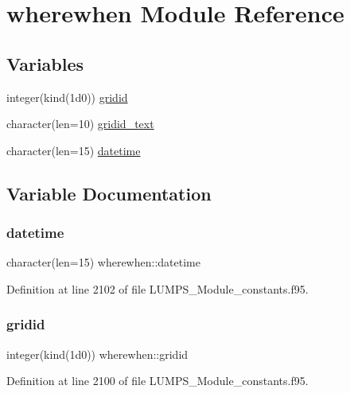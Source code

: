 \hypertarget{namespacewherewhen}{}\section{wherewhen Module Reference}
\label{namespacewherewhen}
\subsection*{Variables}
\begin{DoxyCompactItemize}
\item 
integer(kind(1d0)) \hyperlink{namespacewherewhen_aad33529a6810bf6472d7734b51625654}{gridid}
\item 
character(len=10) \hyperlink{namespacewherewhen_a68eaceec6f42308af79f51f3c7cc76db}{gridid\+\_\+text}
\item 
character(len=15) \hyperlink{namespacewherewhen_afc93ac6f8f3cf65be44806bc77ba2597}{datetime}
\end{DoxyCompactItemize}


\subsection{Variable Documentation}
\mbox{\label{namespacewherewhen_afc93ac6f8f3cf65be44806bc77ba2597}} 
\subsubsection{\texorpdfstring{datetime}{datetime}}
{\footnotesize\ttfamily character(len=15) wherewhen\+::datetime}



Definition at line 2102 of file L\+U\+M\+P\+S\+\_\+\+Module\+\_\+constants.\+f95.

\mbox{\label{namespacewherewhen_aad33529a6810bf6472d7734b51625654}} 
\subsubsection{\texorpdfstring{gridid}{gridid}}
{\footnotesize\ttfamily integer(kind(1d0)) wherewhen\+::gridid}



Definition at line 2100 of file L\+U\+M\+P\+S\+\_\+\+Module\+\_\+constants.\+f95.

